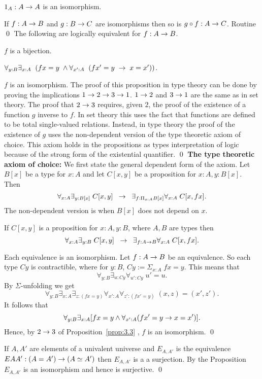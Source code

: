  $\;$
\item $1_A:A\rightarrow A$ is an isomorphism.
\item If $f:A\rightarrow B$ and $g:B\rightarrow C$ are isomorphisms then so is $g\circ f:A\rightarrow C$.
\proof Routine
\qed
{}\label{prop:3.3}
The following are logically equivalent for $f:A\rightarrow B$.
\item $f$ is a bijection.
\item $\forall_{y:B}\exists_{x:A}\;\; (fx=y\;\wedge \forall_{x':A}\;\; (fx'=y\;\rightarrow\; x=x'))$.
\item $f$ is an isomorphism.
\proof
The proof of this proposition in type theory can be done by proving the implications $1\rightarrow 2\rightarrow 3\rightarrow 1$.  $1\rightarrow 2$ and $3\rightarrow 1$ are the same as in set theory.  The proof that $2\rightarrow 3$ requires, given $2$, the proof of the existence of a function $g$ inverse to $f$.  In set theory this uses the fact that functions are defined to be total single-valued relations.  Instead, in type theory the proof of the existence of $g$
uses the non-dependent version of the type theoretic axiom of choice.  This axiom holds in the propositions as types interpretation of logic because of the strong form of the existential quantifier.
\qed
{}
{\bf \large The type theoretic axiom of choice: }
We first state the general dependent form of the axiom.  Let $B[x]$ be a type for $x:A$ and let $C[x,y]$ be a proposition for $x:A,y:B[x]$.  Then 
  \[ \forall_{x:A}\exists_{y:B[x]}\; C[x,y]\;\;\rightarrow\;\; \exists_{f:\Pi_{x:A}B[x]}\forall_{x:A}\; C[x,fx].\]
The non-dependent version is when $B[x]$ does not depend on $x$.

If $C[x,y]$ is a proposition for $x:A, y:B$, where $A,B$ are types then
 \[ \forall_{x:A}\exists_{y:B}\; C[x,y]\;\;\rightarrow\;\; \exists_{f:A\rightarrow B}\forall_{x:A}\; C[x,fx].\]

\label{prop:3.4}
Each equivalence is an isomorphism.
\proof Let $f:A\rightarrow B$ be an equivalence.  So each type $Cy$ is contractible, where for $y:B$, $Cy := \Sigma_{x:A}\; fx=y$.  This means that
  \[ \forall_{y:B}\exists_{u:Cy}\forall_{u':Cy}\; u'=u.\]
By $\Sigma$-unfolding we get
  \[ \forall_{y:B}\exists_{x:A}\exists_{z:(fx=y)}
                            \forall_{x':A}\forall_{z':(fx'=y)}\; (x,z)=(x',z').
  \]
It follows that
  \[ \forall_{y:B}\exists_{x:A}[fx=y\wedge\forall_{x':A}(fx'=y\rightarrow  x=x')].
  \]
Hence, by $2\rightarrow 3$ of Proposition~\ref{prop:3.3} , $f$ is an isomorphism.
\qed 

\label{cor:3.5}
If $A,A'$ are elements of a univalent universe and $E_{A,A'}$ is the equivalence
$EAA':(A=A')\rightarrow (A\simeq A')$ then $E_{A,A'}$ is a a surjection.
\proof By the Proposition $E_{A,A'}$ is an isomorphism and hence is surjective.
\qed




